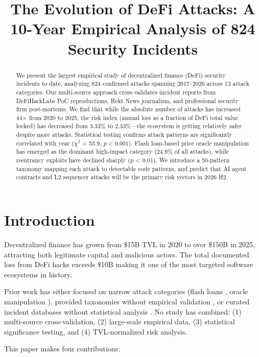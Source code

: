 \documentclass[10pt,conference]{IEEEtran}
\title{The Evolution of DeFi Attacks: A 10-Year Empirical Analysis of 824 Security Incidents}
\author{
  \IEEEauthorblockN{shunfeng8421}
  \IEEEauthorblockA{Independent Security Researcher\\
  GitHub: \texttt{shunfeng8421}\\
  Email: \texttt{shunfeng8421@github}}
}
\begin{document}
\maketitle

\begin{abstract}
We present the largest empirical study of decentralized finance (DeFi) security incidents to date, analyzing 824 confirmed attacks spanning 2017–2026 across 13 attack categories. Our multi-source approach cross-validates incident reports from DeFiHackLabs PoC reproductions, Rekt News journalism, and professional security firm post-mortems. We find that while the absolute number of attacks has increased 44× from 2020 to 2025, the risk index (annual loss as a fraction of DeFi total value locked) has decreased from 3.33\% to 2.33\%—the ecosystem is getting relatively safer despite more attacks. Statistical testing confirms attack patterns are significantly correlated with year ($\chi^2$ = 55.9, $p < 0.001$). Flash loan-based price oracle manipulation has emerged as the dominant high-impact category (24.9\% of all attacks), while reentrancy exploits have declined sharply (p < 0.01). We introduce a 50-pattern taxonomy mapping each attack to detectable code patterns, and predict that AI agent contracts and L2 sequencer attacks will be the primary risk vectors in 2026 H2.
\end{abstract}

\section{Introduction}

Decentralized finance has grown from \$15B TVL in 2020 to over \$150B in 2025, attracting both legitimate capital and malicious actors. The total documented loss from DeFi hacks exceeds \$10B making it one of the most targeted software ecosystems in history.

Prior work has either focused on narrow attack categories (flash loans \cite{qin2021quantifying}, oracle manipulation \cite{zhou2022defi}), provided taxonomies without empirical validation \cite{werner2023sok}, or curated incident databases without statistical analysis \cite{slowmist2021, rekt2020}. No study has combined: (1) multi-source cross-validation, (2) large-scale empirical data, (3) statistical significance testing, and (4) TVL-normalized risk analysis.

This paper makes four contributions:
\end{document}
